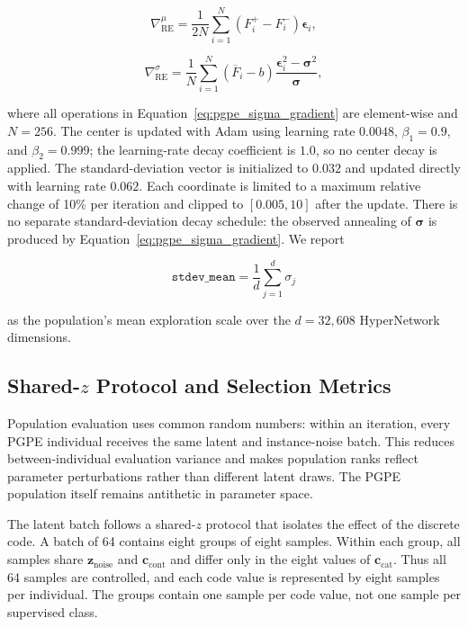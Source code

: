 \begin{equation}
\nabla^{\mu}_{\text{RE}}
= \frac{1}{2N}\sum_{i=1}^{N}
(F_i^+-F_i^-)\boldsymbol{\epsilon}_i,
\end{equation}

\begin{equation}
\nabla^{\sigma}_{\text{RE}}
= \frac{1}{N}\sum_{i=1}^{N}
(\overline{F}_i-b)
\frac{\boldsymbol{\epsilon}_i^2-\boldsymbol{\sigma}^2}
{\boldsymbol{\sigma}},
\label{eq:pgpe_sigma_gradient}
\end{equation}

where all operations in Equation~\ref{eq:pgpe_sigma_gradient} are element-wise and $N=256$. The center is updated with Adam using learning rate $0.0048$, $\beta_1=0.9$, and $\beta_2=0.999$; the learning-rate decay coefficient is $1.0$, so no center decay is applied. The standard-deviation vector is initialized to $0.032$ and updated directly with learning rate $0.062$. Each coordinate is limited to a maximum relative change of 10\% per iteration and clipped to $[0.005,10]$ after the update. There is no separate standard-deviation decay schedule: the observed annealing of $\boldsymbol{\sigma}$ is produced by Equation~\ref{eq:pgpe_sigma_gradient}. We report

\begin{equation}
\texttt{stdev\_mean}
= \frac{1}{d}\sum_{j=1}^{d}\sigma_j
\end{equation}

as the population's mean exploration scale over the $d=32{,}608$ HyperNetwork dimensions.

\subsection{Shared-$z$ Protocol and Selection Metrics}

Population evaluation uses common random numbers: within an iteration, every PGPE individual receives the same latent and instance-noise batch. This reduces between-individual evaluation variance and makes population ranks reflect parameter perturbations rather than different latent draws. The PGPE population itself remains antithetic in parameter space.

The latent batch follows a shared-$z$ protocol that isolates the effect of the discrete code. A batch of 64 contains eight groups of eight samples. Within each group, all samples share $\mathbf{z}_{\text{noise}}$ and $\mathbf{c}_{\text{cont}}$ and differ only in the eight values of $\mathbf{c}_{\text{cat}}$. Thus all 64 samples are controlled, and each code value is represented by eight samples per individual. The groups contain one sample per code value, not one sample per supervised class.

